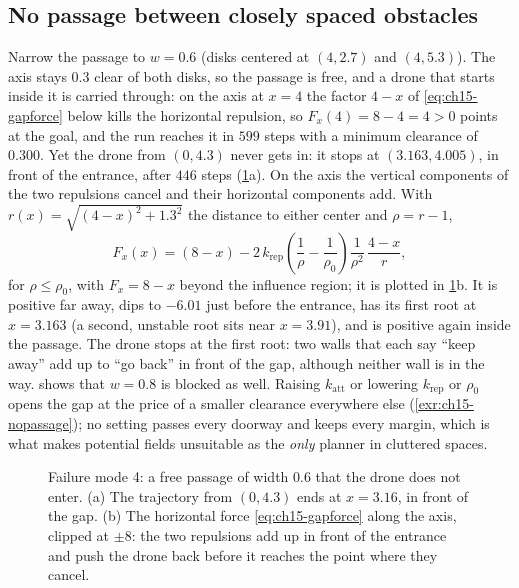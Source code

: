 \subsection{No passage between closely spaced obstacles}
\label{sec:ch15-nopassage}

Narrow the passage to $w = 0.6$ (disks centered at $(4, 2.7)$ and $(4,
5.3)$). The axis stays $0.3$ clear of both disks, so the passage is free,
and a drone that starts inside it is carried through: on the axis at $x = 4$
the factor $4 - x$ of \cref{eq:ch15-gapforce} below kills the horizontal
repulsion, so $F_x(4) = 8 - 4 = 4 > 0$ points at the goal, and the run
 reaches it in $599$
steps with a minimum clearance of $0.300$. Yet the drone from $(0, 4.3)$ never gets in: it stops at
$(3.163, 4.005)$, in front of the entrance, after $446$ steps
(\cref{fig:ch15-nopassage}a). On the axis the vertical components of the two
repulsions cancel and their horizontal components add. With $r(x) =
\sqrt{(4 - x)^2 + 1.3^2}$ the distance to either center and $\rho = r - 1$,
\begin{equation}
  F_x(x) = (8 - x) - 2\, k_{\mathrm{rep}} \left( \frac{1}{\rho} - \frac{1}{\rho_0} \right)
           \frac{1}{\rho^2}\, \frac{4 - x}{r},
  \label{eq:ch15-gapforce}
\end{equation}
for $\rho \le \rho_0$, with $F_x = 8 - x$ beyond the influence region; it is
plotted in \cref{fig:ch15-nopassage}b. It is positive far away, dips to
$-6.01$ just before the entrance, has its first root at $x = 3.163$ (a second,
unstable root sits near $x = 3.91$), and is positive again inside the passage.
The drone stops at the first root: two walls that each say ``keep
away'' add up to ``go back'' in front of the gap, although neither wall is
in the way.  shows that $w = 0.8$ is blocked as well.
Raising $k_{\mathrm{att}}$ or lowering $k_{\mathrm{rep}}$ or $\rho_0$ opens
the gap at the price of a smaller clearance everywhere else
(\cref{exr:ch15-nopassage}); no setting passes every doorway and keeps every
margin, which is what makes potential fields unsuitable as the \emph{only}
planner in cluttered spaces.

\begin{figure}[tb]
  \centering
  \caption{Failure mode 4: a free passage of width $0.6$ that the drone does
  not enter. (a) The trajectory from $(0, 4.3)$ ends at $x = 3.16$, in front
  of the gap. (b) The horizontal force \cref{eq:ch15-gapforce} along the
  axis, clipped at $\pm 8$: the two repulsions add up in front of the
  entrance and push the drone back before it reaches the point where they
  cancel.}
  \label{fig:ch15-nopassage}
\end{figure}

